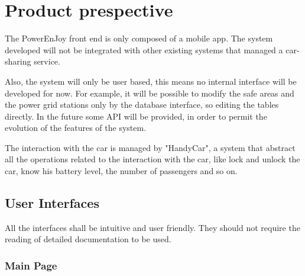 \section{Product prespective}

The PowerEnJoy front end is only composed of a mobile app.
The system developed will not be integrated with other existing systems that managed a car-sharing service.

Also, the system will only be user based, this means no internal interface will be developed for now.
For example, it will be possible to modify the safe areas and the power grid stations only by the database interface, so editing the tables directly.
In the future some API will be provided, in order to permit the evolution of the features of the system.

The interaction with the car is managed by "HandyCar", a system that abstract all the operations related to the interaction with the car, like lock and unlock the car, know his battery level, the number of passengers and so on.


\subsection{User Interfaces}
All the interfaces shall be intuitive and user friendly. They should not
require the reading of detailed documentation to be used.

\subsubsection*{Main Page}


